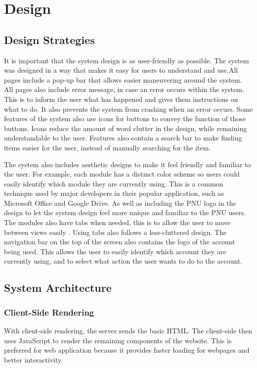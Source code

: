 \chapter{Design}
\section{Design Strategies}
It is important that the system design is as user-friendly as possible. The system was designed in a way that makes it easy for users to understand and use.All pages include a pop-up bar that allows easier maneuvering around the system. All pages also include error message, in case an error occurs within the system. This is to inform the user what has happened and gives them instructions on what to do. It also prevents the system from crashing when an error occurs. Some features of the system also use icons for buttons to convey the function of those buttons. Icons reduce the amount of word clutter in the design, while remaining understandable to the user. Features also contain a search bar to make finding items easier for the user, instead of manually searching for the item.

The system also includes aesthetic designs to make it feel friendly and familiar to the user. For example, each module has a distinct color scheme so users could easily identify which module they are currently using. This is a common technique used by major developers in their popular application, such as Microsoft Office and Google Drive. As well as including the PNU logo in the design to let the system design feel more unique and familiar to the PNU users. The modules also have tabs when needed, this is to allow the user to move between views easily \cite{ref:Tabs}. Using tabs also follows a less-cluttered design. The navigation bar on the top of the screen also contains the logo of the account being used. This allows the user to easily identify which account they are currently using, and to select what action the user wants to do to the account.

\section{System Architecture}

\subsection{Client-Side Rendering}
With client-side rendering, the server sends the basic HTML. The client-side then uses JavaScript to render the remaining components of the website. This is preferred for web application because it provides faster loading for webpages and better interactivity. \cite{ref:ClientSide}

